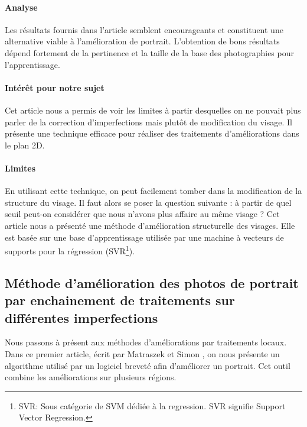 \documentclass[11pt, french]{report-rd-info}
\begin{document}
\paragraph{Analyse}
Les résultats fournis dans l’article semblent encourageants et constituent une alternative viable à l’amélioration de portrait. L’obtention de bons résultats dépend fortement de la pertinence et la taille de la base des photographies pour l’apprentissage.
\paragraph{Intérêt pour notre sujet}
Cet article nous a permis de voir les limites à partir desquelles on ne pouvait plus parler de la correction d’imperfections mais plutôt de modification du visage. Il présente une technique efficace pour réaliser des traitements d’améliorations dans le plan 2D.
\paragraph{Limites}
En utilisant cette technique, on peut facilement tomber dans la modification de la structure du visage. Il faut alors se poser la question suivante : à partir de quel seuil peut-on considérer que nous n’avons plus affaire au même visage ?
Cet article nous a présenté une méthode d’amélioration structurelle des visages. Elle est basée sur une base d’apprentissage utilisée par une machine à vecteurs de supports pour la régression (SVR\footnote{SVR: Sous catégorie de SVM dédiée à la regression. SVR signifie Support Vector Regression.}).
\subsection{Méthode d’amélioration des photos de portrait par enchainement de traitements sur différentes imperfections}
Nous passons à présent aux méthodes d’améliorations par traitements locaux. Dans ce premier article, écrit par Matraszek et Simon \cite{Matraszek2004}, on nous présente un algorithme utilisé par un logiciel breveté afin d'améliorer un portrait. Cet outil combine les améliorations sur plusieurs régions.
\end{document}

